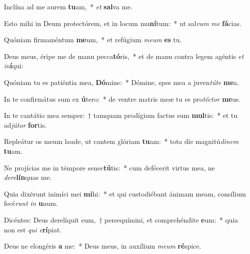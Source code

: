 \item Inclína ad me aurem \textbf{tu}am,~* \textit{et} \textbf{sal}va me.
\item Esto mihi in Deum protectórem, et in locum mu\textbf{ní}tum:~* ut sal\textit{vum} \textit{me} \textbf{fá}cias.
\item Quóniam firmaméntum \textbf{me}um,~* et refúgium \textit{me}\textit{um} \textbf{es} tu.
\item Deus meus, éripe me de manu pecca\textbf{tó}ris,~* et de manu contra legem agéntis \textit{et} \textit{in}\textbf{í}qui:
\item Quóniam tu es patiéntia mea, \textbf{Dó}mine:~* Dómine, spes mea a juven\textit{tú}\textit{te} \textbf{me}a.
\item In te confirmátus sum ex \textbf{ú}tero:~* de ventre matris meæ tu es pro\textit{téc}\textit{tor} \textbf{me}us.
\item In te cantátio mea semper:~† tamquam prodígium factus sum \textbf{mul}tis:~* et tu ad\textit{jú}\textit{tor} \textbf{for}tis.
\item Repleátur os meum laude, ut cantem glóriam \textbf{tu}am:~* tota die magnitú\textit{di}\textit{nem} \textbf{tu}am.
\item Ne projícias me in témpore senec\textbf{tú}tis:~* cum defécerit virtus mea, ne \textit{de}\textit{re}\textbf{lín}quas me.
\item Quia dixérunt inimíci mei \textbf{mi}hi:~* et qui custodiébant ánimam meam, consílium fecé\textit{runt} \textit{in} \textbf{u}num.
\item Dicéntes: Deus derelíquit eum,~† persequímini, et comprehéndite \textbf{e}um:~* quia non est \textit{qui} \textit{e}\textbf{rí}piat.
\item Deus ne elongéris \textbf{a} me:~* Deus meus, in auxílium \textit{me}\textit{um} \textbf{ré}spice.
